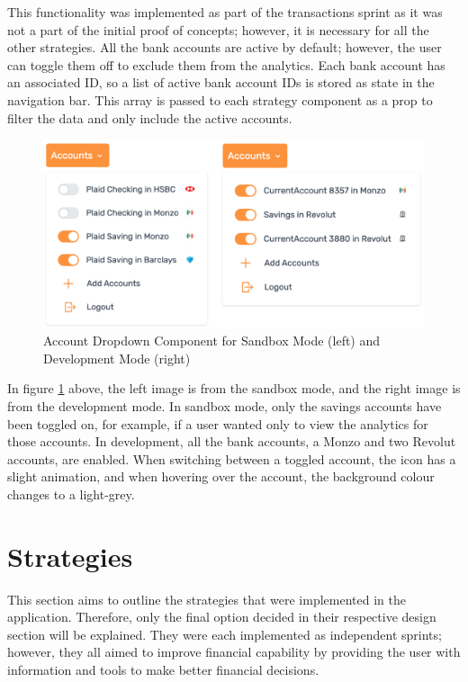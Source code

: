 This functionality was implemented as part of the transactions sprint as it was not a part of the initial proof of concepts; however, it is necessary for all the other strategies. All the bank accounts are active by default; however, the user can toggle them off to exclude them from the analytics. Each bank account has an associated ID, so a list of active bank account IDs is stored as state in the navigation bar. This array is passed to each strategy component as a prop to filter the data and only include the active accounts.

\vspace{\baselineskip}

\begin{figure}[H]
	\centering
	\includegraphics[width=\textwidth]{images/accounts_dropdown.png}
	\caption{Account Dropdown Component for Sandbox Mode (left) and Development Mode (right)}
	\label{fig:AccountsDropdown}
\end{figure}


In figure \ref{fig:AccountsDropdown} above, the left image is from the sandbox mode, and the right image is from the development mode. In sandbox mode, only the savings accounts have been toggled on, for example, if a user wanted only to view the analytics for those accounts. In development, all the bank accounts, a Monzo and two Revolut accounts, are enabled. When switching between a toggled account, the icon has a slight animation, and when hovering over the account, the background colour changes to a light-grey.


\section{Strategies}
This section aims to outline the strategies that were implemented in the application. Therefore, only the final option decided in their respective design section will be explained. They were each implemented as independent sprints; however, they all aimed to improve financial capability by providing the user with information and tools to make better financial decisions.

